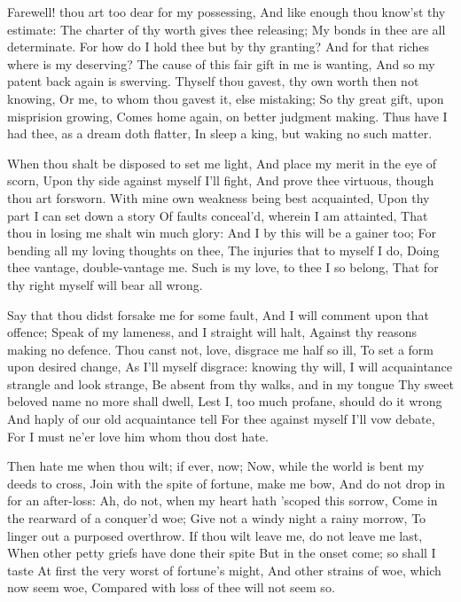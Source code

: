 \documentclass[twocolumn]{book}
\begin{document}
Farewell! thou art too dear for my possessing,
And like enough thou know'st thy estimate:
The charter of thy worth gives thee releasing;
My bonds in thee are all determinate.
For how do I hold thee but by thy granting?
And for that riches where is my deserving?
The cause of this fair gift in me is wanting,
And so my patent back again is swerving.
Thyself thou gavest, thy own worth then not knowing,
Or me, to whom thou gavest it, else mistaking;
So thy great gift, upon misprision growing,
Comes home again, on better judgment making.
  Thus have I had thee, as a dream doth flatter,
  In sleep a king, but waking no such matter.


When thou shalt be disposed to set me light,
And place my merit in the eye of scorn,
Upon thy side against myself I'll fight,
And prove thee virtuous, though thou art forsworn.
With mine own weakness being best acquainted,
Upon thy part I can set down a story
Of faults conceal'd, wherein I am attainted,
That thou in losing me shalt win much glory:
And I by this will be a gainer too;
\numerus*{}For bending all my loving thoughts on thee,
The injuries that to myself I do,
Doing thee vantage, double-vantage me.
  Such is my love, to thee I so belong,
  That for thy right myself will bear all wrong.


Say that thou didst forsake me for some fault,
And I will comment upon that offence;
Speak of my lameness, and I straight will halt,
Against thy reasons making no defence.
\numerus*{}Thou canst not, love, disgrace me half so ill,
To set a form upon desired change,
As I'll myself disgrace: knowing thy will,
I will acquaintance strangle and look strange,
Be absent from thy walks, and in my tongue
Thy sweet beloved name no more shall dwell,
Lest I, too much profane, should do it wrong
And haply of our old acquaintance tell
  For thee against myself I'll vow debate,
  For I must ne'er love him whom thou dost hate.


Then hate me when thou wilt; if ever, now;
Now, while the world is bent my deeds to cross,
Join with the spite of fortune, make me bow,
And do not drop in for an after-loss:
Ah, do not, when my heart hath 'scoped this sorrow,
Come in the rearward of a conquer'd woe;
Give not a windy night a rainy morrow,
To linger out a purposed overthrow.
If thou wilt leave me, do not leave me last,
When other petty griefs have done their spite
But in the onset come; so shall I taste
At first the very worst of fortune's might,
  And other strains of woe, which now seem woe,
  Compared with loss of thee will not seem so.
\end{document}
